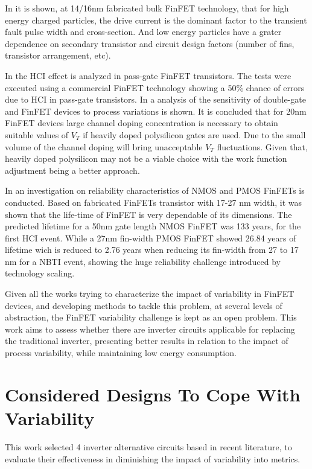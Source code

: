 \documentclass[pgmicro,diss,english]{iiufrgs}
\begin{document}
In \cite{FinFET01} it is shown, at 14/16nm fabricated bulk FinFET technology, that for high energy charged particles, the drive current is the dominant factor to the transient fault pulse width and cross-section. And low energy particles have a grater dependence on secondary transistor and circuit design factors (number of fins, transistor arrangement, etc).

In \cite{FinFET02} the HCI effect is analyzed in pass-gate FinFET transistors. The tests were executed using a commercial FinFET technology showing a 50\% chance of errors due to HCI in pass-gate transistors. In \cite{FinFET03} a analysis of the sensitivity of double-gate and FinFET devices to process variations is shown. It is concluded that for 20nm FinFET devices large channel doping concentration is necessary to obtain suitable values of $V_T$ if heavily doped polysilicon gates are used. Due to the small volume of the channel doping will bring unacceptable $V_T$ fluctuations. Given that, heavily doped polysilicon may not be a viable choice with the work function adjustment being a better approach.

 In \cite{FINFET05} an investigation on reliability characteristics of NMOS and PMOS FinFETs is conducted. Based on fabricated FinFETs transistor with 17-27 nm width, it was shown that the life-time of FinFET is very dependable of its dimensions. The predicted lifetime for a 50nm gate length NMOS FinFET was 133 years, for the first HCI event. While a 27nm fin-width PMOS FinFET showed 26.84 years of lifetime wich is reduced to 2.76 years when reducing its fin-width from 27 to 17 nm for a NBTI event, showing the huge reliability challenge introduced by technology scaling.

Given all the works trying to characterize the impact of variability in FinFET devices, and developing methods to tackle this problem, at several levels of abstraction, the FinFET variability challenge is kept as an open problem. This work aims to assess whether there are inverter circuits applicable for replacing the traditional inverter, presenting better results in relation to the impact of process variability, while maintaining low energy consumption.


\chapter{Considered Designs To Cope With Variability}

This work selected 4 inverter alternative circuits based in recent literature, to evaluate their effectiveness in diminishing the impact of variability into metrics.
\end{document}
